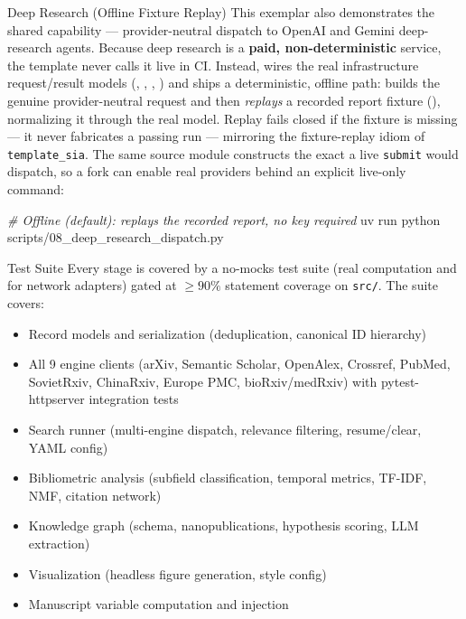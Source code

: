 \documentclass[
  ignorenonframetext,
]{beamer}
\newenvironment{Shaded}{}{}
\newcommand{\CommentTok}[1]{\textcolor[rgb]{0.38,0.63,0.69}{\textit{#1}}}
\newcommand{\ExtensionTok}[1]{#1}
\newcommand{\NormalTok}[1]{#1}
\providecommand{\tightlist}{%
  \setlength{\itemsep}{0pt}\setlength{\parskip}{0pt}}
\begin{document}
\begin{frame}{Deep Research (Offline Fixture
Replay)}
\label{deep-research-offline-fixture-replay}
This exemplar also demonstrates the shared
 capability ---
provider-neutral dispatch to OpenAI and Gemini deep-research agents.
Because deep research is a \textbf{paid, non-deterministic} service, the
template never calls it live in CI. Instead,
 wires the real infrastructure
request/result models (,
, ,
) and ships a deterministic, offline path:
 builds the genuine
provider-neutral request and then \emph{replays} a recorded report
fixture (),
normalizing it through the real  model.
Replay fails closed if the fixture is missing --- it never fabricates a
passing run --- mirroring the fixture-replay idiom of
\texttt{template\_sia}. The same source module constructs the exact
 a live \texttt{submit} would dispatch, so a
fork can enable real providers behind an explicit live-only command:

\begin{Shaded}
\begin{Highlighting}[]
\CommentTok{\# Offline (default): replays the recorded report, no key required}
\ExtensionTok{uv}\NormalTok{ run python scripts/08\_deep\_research\_dispatch.py}
\end{Highlighting}
\end{Shaded}
\end{frame}

\begin{frame}{Test Suite}
\label{test-suite}
Every stage is covered by a no-mocks test suite (real computation and
 for network adapters) gated at \(\geq 90\%\)
statement coverage on \texttt{src/}. The suite covers:

\begin{itemize}
\tightlist
\item
  Record models and serialization (deduplication, canonical ID
  hierarchy)
\item
  All 9 engine clients (arXiv, Semantic Scholar, OpenAlex, Crossref,
  PubMed, SovietRxiv, ChinaRxiv, Europe PMC, bioRxiv/medRxiv) with
  pytest-httpserver integration tests
\item
  Search runner (multi-engine dispatch, relevance filtering,
  resume/clear, YAML config)
\item
  Bibliometric analysis (subfield classification, temporal metrics,
  TF-IDF, NMF, citation network)
\item
  Knowledge graph (schema, nanopublications, hypothesis scoring, LLM
  extraction)
\item
  Visualization (headless figure generation, style config)
\item
  Manuscript variable computation and injection
\end{itemize}
\end{frame}
\end{document}
